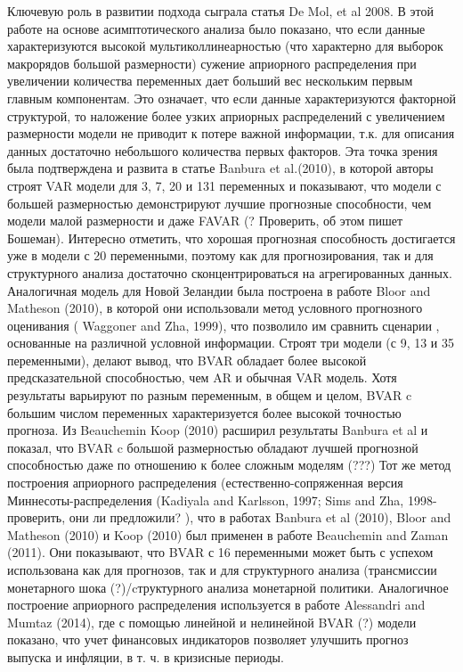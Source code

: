 \documentclass[11pt]{article} %
\begin{document}
Ключевую роль в развитии подхода сыграла статья De Mol, et al 2008. В этой работе на основе асимптотического анализа было показано, что если данные характеризуются высокой мультиколлинеарностью (что характерно для выборок макрорядов большой размерности) сужение априорного распределения при увеличении количества переменных дает больший вес нескольким первым главным компонентам.  Это означает, что если данные характеризуются факторной структурой, то наложение более узких априорных распределений с увеличением размерности модели  не  приводит к потере важной информации, т.к. для описания данных достаточно небольшого количества первых факторов.  Эта точка зрения  была подтверждена и развита в статье Banbura et al.(2010), в которой авторы  строят VAR модели для 3, 7, 20 и 131 переменных и показывают, что модели с большей размерностью демонстрируют лучшие прогнозные способности, чем модели малой размерности и даже FAVAR (? Проверить, об этом пишет Бошеман). Интересно отметить, что хорошая прогнозная способность достигается уже в модели с 20  переменными, поэтому как для прогнозирования, так и для структурного анализа достаточно сконцентрироваться на агрегированных данных.
Аналогичная модель для Новой Зеландии была построена в работе Bloor and Matheson (2010), в которой они использовали метод условного прогнозного оценивания ( Waggoner and Zha, 1999), что позволило им сравнить сценарии , основанные на различной условной информации.  Строят три модели (с 9, 13 и 35 переменными), делают вывод, что BVAR обладает более высокой предсказательной способностью, чем AR и обычная VAR модель.  Хотя результаты варьируют по разным переменным, в общем и целом, BVAR c большим числом переменных характеризуется более высокой точностью прогноза.
Из Beauchemin
Koop (2010) расширил результаты Banbura et al  и показал, что BVAR c большой размерностью обладают лучшей прогнозной способностью даже по отношению  к более сложным моделям (???)
Тот же метод построения априорного распределения (естественно-сопряженная версия Миннесоты-распределения (Kadiyala and Karlsson, 1997; Sims and Zha, 1998- проверить, они ли предложили? ), что в работах Banbura et al (2010), Bloor and Matheson (2010) и Koop (2010) был применен в работе Beauchemin and Zaman (2011). Они показывают, что BVAR с 16 переменными может быть с успехом использована как для прогнозов, так и для структурного анализа (трансмиссии монетарного шока (?)/cтруктурного анализа монетарной политики. Аналогичное построение априорного распределения используется в работе Alessandri and Mumtaz (2014), где с помощью линейной и нелинейной BVAR (?) модели показано, что учет финансовых индикаторов позволяет улучшить прогноз выпуска и инфляции, в т. ч. в кризисные периоды.
\end{document}
